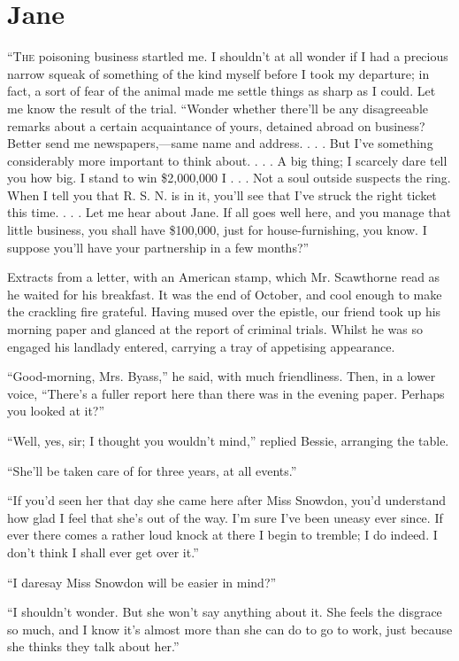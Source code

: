 \chapter{Jane}

\textsc{``The} poisoning business startled me. I shouldn't at all wonder
if I had a precious narrow squeak of something of the kind myself before
I took my departure; in fact, a sort of fear of the animal made me
settle things as sharp as I could. Let me know the result of the trial.
``Wonder whether there'll be any disagreeable remarks about a certain
acquaintance of yours, detained abroad on business? Better send me
newspapers,---same name and address. . . . But I've something
considerably more important to think about. . . . A big thing; I
scarcely dare tell you how big. I stand to win \$2,000,000 I . . . Not a
soul outside suspects the ring. When I tell you that R. S. N. is in it,
you'll see that I've struck the right ticket this time. . . . Let me
hear about Jane. If all goes well here, and you manage that little
business, you shall have \$100,000, just for {}house-furnishing, you
know. I suppose you'll have your partnership in a few months?''

Extracts from a letter, with an American stamp, which Mr. Scawthorne
read as he waited for his breakfast. It was the end of October, and cool
enough to make the crackling fire grateful. Having mused over the
epistle, our friend took up his morning paper and glanced at the report
of criminal trials. Whilst he was so engaged his landlady entered,
carrying a tray of appetising appearance.

``Good-morning, Mrs. Byass,'' he said, with much friendliness. Then, in
a lower voice, ``There's a fuller report here than there was in the
evening paper. Perhaps you looked at it?''

``Well, yes, sir; I thought you wouldn't mind,'' replied Bessie,
arranging the table.

``She'll be taken care of for three years, at all events.''

``If you'd seen her that day she came here after Miss Snowdon, you'd
understand how glad I feel that she's out of the way. I'm sure I've been
uneasy ever since. If ever there comes a rather loud knock at there I
begin to tremble; I do indeed. I don't think I shall ever get over it.''

{}``I daresay Miss Snowdon will be easier in mind?''

``I shouldn't wonder. But she won't say anything about it. She feels the
disgrace so much, and I know it's almost more than she can do to go to
work, just because she thinks they talk about her.''

